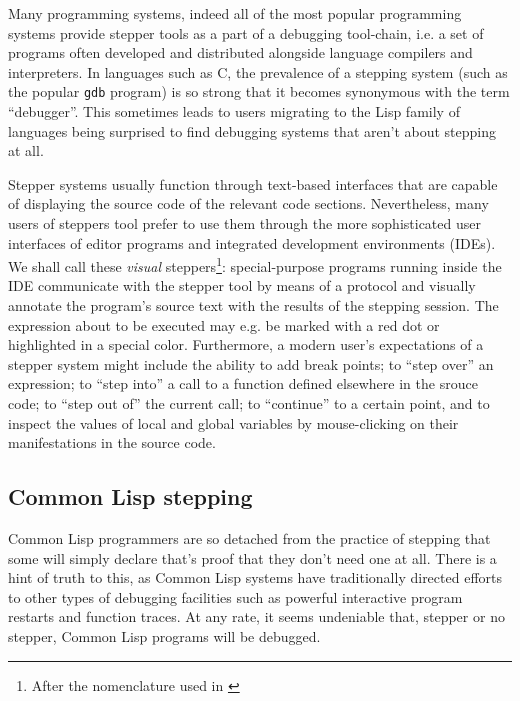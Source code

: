\documentclass[sigconf]{acmart}
\begin{document}
Many programming systems, indeed all of the most popular programming
systems provide stepper tools as a part of a debugging tool-chain,
i.e. a set of programs often developed and distributed alongside
language compilers and interpreters.  In languages such as C, the
prevalence of a stepping system (such as the popular \texttt{gdb}
program) is so strong that it becomes synonymous with the term
``debugger''. This sometimes leads to users migrating to the Lisp
family of languages being surprised to find debugging systems that
aren't about stepping at all.

Stepper systems usually function through text-based interfaces that
are capable of displaying the source code of the relevant code
sections.  Nevertheless, many users of steppers tool prefer to use
them through the more sophisticated user interfaces of editor programs
and integrated development environments (IDEs).  We shall call these
\emph{visual} steppers\footnote{After the nomenclature used in
  \cite{annotation-based}}: special-purpose programs running inside
the IDE communicate with the stepper tool by means of a protocol and
visually annotate the program's source text with the results of the
stepping session.  The expression about to be executed may e.g. be
marked with a red dot or highlighted in a special color.  Furthermore,
a modern user's expectations of a stepper system might include the
ability to add break points; to ``step over'' an expression; to ``step
into'' a call to a function defined elsewhere in the srouce code; to
``step out of'' the current call; to ``continue'' to a certain point,
and to inspect the values of local and global variables by
mouse-clicking on their manifestations in the source code.

\subsection{Common Lisp stepping}


Common Lisp programmers are so detached from the practice of stepping
that some will simply declare that's proof that they don't need one at
all.  There is a hint of truth to this, as Common Lisp systems have
traditionally directed efforts to other types of debugging facilities
such as powerful interactive program restarts and function traces.  At
any rate, it seems undeniable that, stepper or no stepper, Common Lisp
programs will be debugged.
\end{document}
